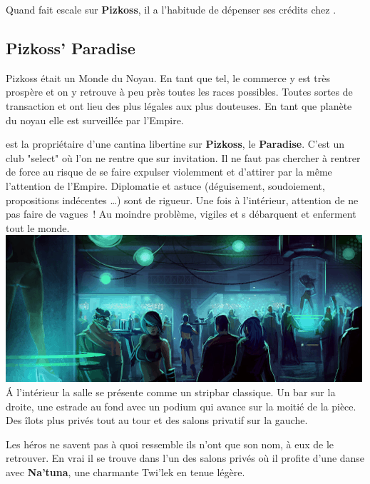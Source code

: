 Quand  fait escale sur \textbf{Pizkoss}, il a l’habitude de dépenser ses crédits chez .

\newpage
\subsection{Pizkoss’ Paradise}
Pizkoss était un Monde du Noyau. En tant que tel, le commerce y est très prospère et on y retrouve à peu près toutes les races possibles. Toutes sortes de transaction et ont lieu des plus légales aux plus douteuses. En tant que planète du noyau elle est surveillée par l’Empire.

 est la propriétaire d’une cantina libertine sur \textbf{Pizkoss}, le \textbf{Paradise}. C’est un club "select" où l’on ne rentre que sur invitation. Il ne faut pas chercher à rentrer de force au risque de se faire expulser violemment et d’attirer par la même l’attention de l’Empire. Diplomatie et astuce (déguisement, soudoiement, propositions indécentes \ldots) sont de rigueur. Une fois à l’intérieur, attention de ne pas faire de vagues~! Au moindre problème, vigiles et s débarquent et enferment tout le monde.\\

\noindent\includegraphics[width=\linewidth]{_img/places/paradise-club.png}\\

\'A l’intérieur la salle se présente comme un stripbar classique. Un bar sur la droite, une estrade au fond avec un podium qui avance sur la moitié de la pièce. Des îlots plus privés tout au tour et des salons privatif sur la gauche. 

Les héros ne savent pas à quoi ressemble  ils n’ont que son nom, à eux de le retrouver. En vrai il se trouve dans l’un des salons privés où il profite d’une danse avec \textbf{Na’tuna}, une charmante Twi’lek en tenue légère.

